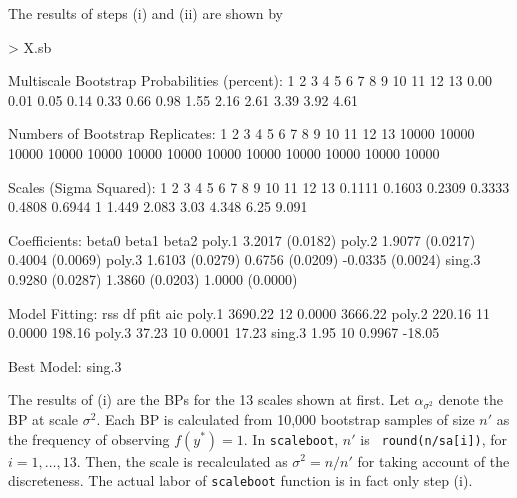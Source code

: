 \documentclass[a4paper]{amsart}
\begin{document}
The results of steps (i) and (ii) are shown by
\begin{Schunk}
\begin{Sinput}
> X.sb
\end{Sinput}
\begin{Soutput}
Multiscale Bootstrap Probabilities (percent):
1    2    3    4    5    6    7    8    9    10   11   12   13   
0.00 0.01 0.05 0.14 0.33 0.66 0.98 1.55 2.16 2.61 3.39 3.92 4.61 

Numbers of Bootstrap Replicates:
1     2     3     4     5     6     7     8     9     10    11    12    13    
10000 10000 10000 10000 10000 10000 10000 10000 10000 10000 10000 10000 10000 

Scales (Sigma Squared):
1      2      3      4      5      6      7 8     9     10   11    12   13    
0.1111 0.1603 0.2309 0.3333 0.4808 0.6944 1 1.449 2.083 3.03 4.348 6.25 9.091 

Coefficients:
       beta0           beta1           beta2            
poly.1 3.2017 (0.0182)                                  
poly.2 1.9077 (0.0217) 0.4004 (0.0069)                  
poly.3 1.6103 (0.0279) 0.6756 (0.0209) -0.0335 (0.0024) 
sing.3 0.9280 (0.0287) 1.3860 (0.0203)  1.0000 (0.0000) 

Model Fitting:
       rss     df pfit   aic     
poly.1 3690.22 12 0.0000 3666.22 
poly.2  220.16 11 0.0000  198.16 
poly.3   37.23 10 0.0001   17.23 
sing.3    1.95 10 0.9967  -18.05 

Best Model:  sing.3 
\end{Soutput}
\end{Schunk}

The results of (i) are the BPs for the 13 scales shown at first. Let
$\alpha_{\sigma^2}$ denote the BP at scale $\sigma^2$. Each BP is
calculated from 10,000 bootstrap samples of size $n'$ as the frequency
of observing $f(y^*)=1$. In {\tt scaleboot}, $n'$ is {\tt
round(n/sa[i])}, for $i=1,\ldots,13$. Then, the scale is recalculated
as $\sigma^2=n/n'$ for taking account of the discreteness. The actual
labor of {\tt scaleboot} function is in fact only step (i).
\end{document}
